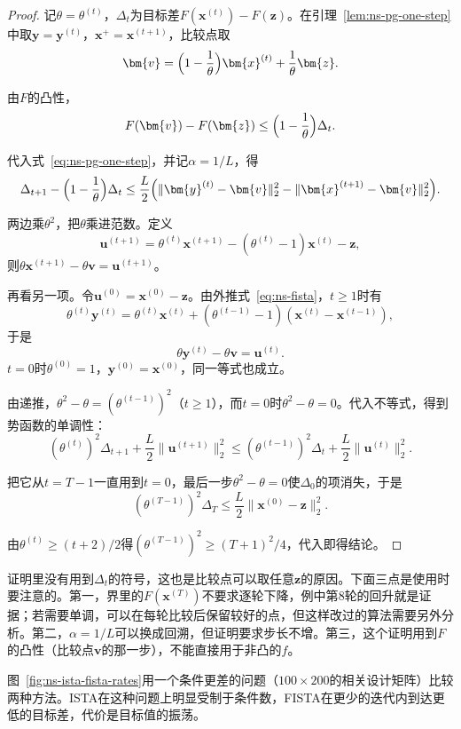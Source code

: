\begin{proof}
记$\theta=\theta^{(t)}$，$\Delta_t$为目标差$F(\bm{x}^{(t)})-F(\bm{z})$。在引理~\ref{lem:ns-pg-one-step}中取$\bm{y}=\bm{y}^{(t)}$，$\bm{x}^{+}=\bm{x}^{(t+1)}$，比较点取
\[
 \bm{v}=\Bigl(1-\frac1\theta\Bigr)\bm{x}^{(t)}+\frac1\theta\bm{z}.
\]

由$F$的凸性，
\[
 F(\bm{v})-F(\bm{z})\leq\Bigl(1-\frac1\theta\Bigr)\Delta_t.
\]

代入式~\eqref{eq:ns-pg-one-step}，并记$\alpha=1/L$，得
\[
 \Delta_{t+1}-\Bigl(1-\frac1\theta\Bigr)\Delta_t\leq\frac L2\Bigl(\lVert\bm{y}^{(t)}-\bm{v}\rVert_2^2-\lVert\bm{x}^{(t+1)}-\bm{v}\rVert_2^2\Bigr).
\]

两边乘$\theta^2$，把$\theta$乘进范数。定义
\[
 \bm{u}^{(t+1)}=\theta^{(t)}\bm{x}^{(t+1)}-(\theta^{(t)}-1)\bm{x}^{(t)}-\bm{z},
\]
则$\theta\bm{x}^{(t+1)}-\theta\bm{v}=\bm{u}^{(t+1)}$。

再看另一项。令$\bm{u}^{(0)}=\bm{x}^{(0)}-\bm{z}$。由外推式~\eqref{eq:ns-fista}，$t\geq1$时有
\[
 \theta^{(t)}\bm{y}^{(t)}=\theta^{(t)}\bm{x}^{(t)}+(\theta^{(t-1)}-1)(\bm{x}^{(t)}-\bm{x}^{(t-1)}),
\]
于是
\[
 \theta\bm{y}^{(t)}-\theta\bm{v}=\bm{u}^{(t)}.
\]
$t=0$时$\theta^{(0)}=1$，$\bm{y}^{(0)}=\bm{x}^{(0)}$，同一等式也成立。

由递推，$\theta^2-\theta=(\theta^{(t-1)})^2$（$t\geq1$），而$t=0$时$\theta^2-\theta=0$。代入不等式，得到势函数的单调性：
\[
 (\theta^{(t)})^2\Delta_{t+1}+\frac L2\lVert\bm{u}^{(t+1)}\rVert_2^2\leq(\theta^{(t-1)})^2\Delta_t+\frac L2\lVert\bm{u}^{(t)}\rVert_2^2.
\]

把它从$t=T-1$一直用到$t=0$，最后一步$\theta^2-\theta=0$使$\Delta_0$的项消失，于是
\[
 (\theta^{(T-1)})^2\Delta_T\leq\frac L2\lVert\bm{x}^{(0)}-\bm{z}\rVert_2^2.
\]

由$\theta^{(t)}\geq(t+2)/2$得$(\theta^{(T-1)})^2\geq(T+1)^2/4$，代入即得结论。
\end{proof}

证明里没有用到$\Delta_t$的符号，这也是比较点可以取任意$\bm{z}$的原因。下面三点是使用时要注意的。第一，界里的$F(\bm{x}^{(T)})$不要求逐轮下降，例中第$8$轮的回升就是证据；若需要单调，可以在每轮比较后保留较好的点，但这样改过的算法需要另外分析。第二，$\alpha=1/L$可以换成回溯，但证明要求步长不增。第三，这个证明用到$F$的凸性（比较点$\bm{v}$的那一步），不能直接用于非凸的$f$。

图~\ref{fig:ns-ista-fista-rates}用一个条件更差的问题（$100\times200$的相关设计矩阵）比较两种方法。ISTA在这种问题上明显受制于条件数，FISTA在更少的迭代内到达更低的目标差，代价是目标值的振荡。

